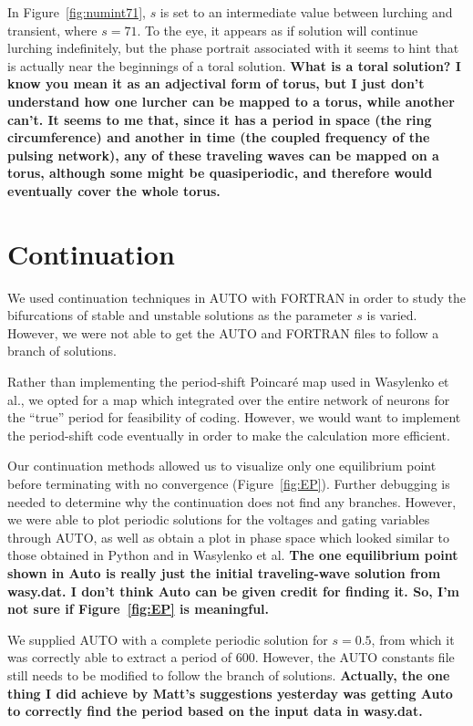 \documentclass[12pt,letterpaper,oneside,openany]{article}
\begin{document}
In Figure~\ref{fig:numint71}, $s$ is set to an intermediate value between lurching and transient, where $s = 71$. To the eye, it appears as if solution will continue lurching indefinitely, but the phase portrait associated with it seems to hint that is actually near the beginnings of a toral solution.
\textbf{What is a toral solution? I know you mean it as an adjectival form of torus, but I just don't understand how one lurcher can be mapped to a torus, while another can't. It seems to me that, since it has a period in space (the ring circumference) and another in time (the coupled frequency of the pulsing network), any of these traveling waves can be mapped on a torus, although some might be quasiperiodic, and therefore would eventually cover the whole torus.}

\section{Continuation}

We used continuation techniques in AUTO with FORTRAN in order to study the bifurcations of stable and unstable solutions as the parameter $s$ is varied. However, we were not able to get the AUTO and FORTRAN files to follow a branch of solutions.

Rather than implementing the period-shift Poincar\'{e} map used in Wasylenko et al.\cite{Wasylenko2010}, we opted for a map which integrated over the entire network of neurons for the ``true'' period for feasibility of coding. However, we would want to implement the period-shift code eventually in order to make the calculation more efficient.

Our continuation methods allowed us to visualize only one equilibrium point before terminating with no convergence (Figure~\ref{fig:EP}). Further debugging is needed to determine why the continuation does not find any branches. However, we were able to plot periodic solutions for the voltages and gating variables through AUTO, as well as obtain a plot in phase space which looked similar to those obtained in Python and in Wasylenko et al.\cite{Wasylenko2010}
\textbf{The one equilibrium point shown in Auto is really just the initial traveling-wave solution from wasy.dat. I don't think Auto can be given credit for finding it. So, I'm not sure if Figure~\ref{fig:EP} is meaningful.}

We supplied AUTO with a complete periodic solution for $s = 0.5$, from which it was correctly able to extract a period of $600$. However, the AUTO constants file still needs to be modified to follow the branch of solutions.
\textbf{Actually, the one thing I did achieve by Matt's suggestions yesterday was getting Auto to correctly find the period based on the input data in wasy.dat.}
\end{document}
